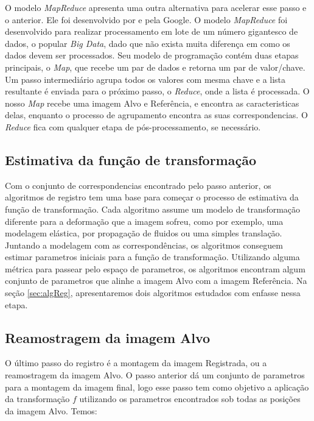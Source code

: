     O modelo \textit{MapReduce} apresenta uma outra alternativa para acelerar esse passo e o anterior. Ele foi 
desenvolvido por \cite{dean2008mapreduce} e pela Google. O modelo \textit{MapReduce} foi desenvolvido para realizar 
processamento em lote de um número gigantesco de dados, o popular \textit{Big Data}, dado que não exista muita diferença 
em como os dados devem ser processados. Seu modelo de programação contém duas etapas principais, o \textit{Map}, que 
recebe um par de dados e retorna um par de valor/chave. Um passo intermediário agrupa todos os valores com mesma chave e
a lista resultante é enviada para o próximo passo, o \textit{Reduce}, onde a lista é processada. O nosso \textit{Map} 
recebe uma imagem Alvo e Referência, e encontra as caracteristicas delas, enquanto o processo de agrupamento encontra as
suas correspondencias. O \textit{Reduce} fica com qualquer etapa de pós-processamento, se necessário.
\subsection{Estimativa da função de transformação}
    
    Com o conjunto de correspondencias encontrado pelo passo anterior, os algoritmos de registro tem uma base para 
começar o processo de estimativa da função de transformação. Cada algoritmo assume um modelo de transformação diferente
para a deformação que a imagem sofreu, como por exemplo, uma modelagem elástica, por propagação de fluidos ou uma
simples translação. Juntando a modelagem com as correspondências, os algoritmos conseguem estimar parametros iniciais
para a função de transformação. Utilizando alguma métrica para passear pelo espaço de parametros, os algoritmos encontram
algum conjunto de parametros que alinhe a imagem Alvo com a imagem Referência. Na seção \ref{sec:algReg}, apresentaremos
dois algoritmos estudados com enfasse nessa etapa.

\subsection{Reamostragem da imagem Alvo}

    O último passo do registro é a montagem da imagem Registrada, ou a reamostragem da imagem Alvo. O passo anterior
dá um conjunto de parametros para a montagem da imagem final, logo esse passo tem como objetivo a aplicação
da transformação $f$ utilizando os parametros encontrados sob todas as posições da imagem Alvo. Temos:

